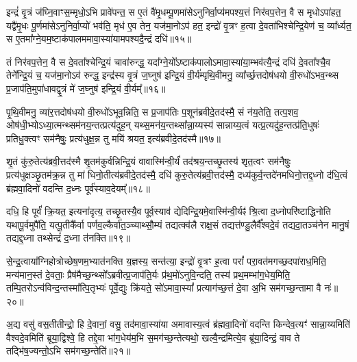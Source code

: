{\anuvakamend[{अ॒स्य॒ मा वेदा द्यावा॑पृथि॒व्योर॑ब्रवी॒दिति॒ तस्मा᳚च्च॒त्वारि॑ च॥२॥}]}

इन्द्रं॑ वृ॒त्रं ज॑घ्नि॒वाꣳस॒म्मृधो॒\-ऽभि प्रावे॑पन्त॒ स ए॒तं वै॑मृ॒धम्पू॒णमा॑से\-ऽनुनिर्वा॒प्य॑मपश्य॒त्तं निर॑वप॒त्तेन॒ वै स मृधो\-ऽपा॑हत॒ यद्वै॑मृ॒धः पू॒र्णमा॑से\-ऽनुनिर्वा॒प्यो॑ भव॑ति॒ मृध॑ ए॒व तेन॒ यज॑मा॒नो\-ऽप॑ हत॒ इन्द्रो॑ वृ॒त्रꣳ ह॒त्वा दे॒वता॑भिश्चेन्द्रि॒येण॑ च॒ व्या᳚र्ध्यत॒ स ए॒तमा᳚ग्ने॒यम॒ष्टाक॑पालममावा॒स्या॑यामपश्यदै॒न्द्रं दधि॑॥१५॥

तं निर॑वप॒त्तेन॒ वै स दे॒वता᳚श्चेन्द्रि॒यं चावा॑रुन्द्ध॒ यदा᳚ग्ने॒यो᳚\-ऽष्टाक॑पालो\-ऽमावा॒स्या॑या॒म्भव॑त्यै॒न्द्रं दधि॑ दे॒वता᳚श्चै॒व तेने᳚न्द्रि॒यं च॒ यज॑मा॒नो\-ऽव॑ रुन्द्ध॒ इन्द्र॑स्य वृ॒त्रं ज॒घ्नुष॑ इन्द्रि॒यं वी॒र्य॑म्पृथि॒वीमनु॒ व्या᳚र्च्छ॒त्तदोष॑धयो वी॒रुधो॑\-ऽभव॒न्थ्स प्र॒जाप॑ति॒मुपा॑धावद्वृ॒त्रं मे॑ ज॒घ्नुष॑ इन्द्रि॒यं वी॒र्यम्᳚॥१६॥

पृ॒थि॒वीमनु॒ व्या॑र॒त्तदोष॑धयो वी॒रुधो॑\-ऽभूव॒न्निति॒ स प्र॒जाप॑तिः प॒शून॑ब्रवीदे॒तद॑स्मै॒ सं न॑य॒तेति॒ तत्प॒शव॒ ओष॑धी॒भ्यो\-ऽध्या॒त्मन्थ्सम॑नय॒न्तत्प्रत्य॑दुह॒न् यथ्स॒मन॑य॒न्तथ्सा᳚न्ना॒य्यस्य॑ सान्नाय्य॒त्वं यत्प्र॒त्यदु॑ह॒न्तत्प्र॑ति॒धुषः॑ प्रतिधु॒क्त्वꣳ सम॑नैषुः॒ प्रत्य॑धुक्ष॒न्न तु मयि॑ श्रयत॒ इत्य॑ब्रवीदे॒तद॑स्मै॥१७॥

शृ॒तं कु॑रु॒तेत्य॑ब्रवी॒त्तद॑स्मै शृ॒तम॑कुर्वन्निन्द्रि॒यं वावास्मि॑न्वी॒र्यं॑ तद॑श्रय॒न्तच्छृ॒तस्य॑ शृत॒त्वꣳ सम॑नैषुः॒ प्रत्य॑धुक्षञ्छृ॒तम॑क्र॒न्न तु मा॑ धिनो॒तीत्य॑ब्रवीदे॒तद॑स्मै॒ दधि॑ कुरु॒तेत्य॑ब्रवी॒त्तद॑स्मै॒ दध्य॑कुर्व॒न्तदे॑नमधिनो॒त्तद्द॒ध्नो द॑धि॒त्वं ब्र॑ह्मवा॒दिनो॑ वदन्ति द॒ध्नः पूर्व॑स्याव॒देयम्᳚॥१८॥

दधि॒ हि पूर्वं॑ क्रि॒यत॒ इत्यना॑दृत्य॒ तच्छृ॒तस्यै॒व पूर्व॒स्याव॑ द्येदिन्द्रि॒यमे॒वास्मि॑न्वी॒र्यꣴ॑ श्रि॒त्वा द॒ध्नोपरि॑ष्टाद्धिनोति यथापू॒र्वमुपै॑ति॒ यत्पू॒तीकै᳚र्वा पर्णव॒ल्कैर्वा॑त॒ञ्च्याथ्सौ॒म्यं तद्यत्क्व॑लै राक्ष॒सं तद्यत्त॑ण्डु॒लैर्वै᳚श्वदे॒वं तद्यदा॒तञ्च॑नेन मानु॒षं तद्यद्द॒ध्ना तथ्सेन्द्रं॑ द॒ध्ना त॑नक्ति॥१९॥

से॒न्द्र॒त्वाया᳚ग्निहोत्रोच्छेष॒णम॒भ्यात॑नक्ति य॒ज्ञस्य॒ सन्त॑त्या॒ इन्द्रो॑ वृ॒त्रꣳ ह॒त्वा परां᳚ परा॒वत॑मगच्छ॒दपा॑राध॒मिति॒ मन्य॑मान॒स्तं दे॒वताः॒ प्रैष॑मैच्छ॒न्थ्सो᳚\-ऽब्रवीत्प्र॒जाप॑ति॒र्यः प्र॑थ॒मो॑\-ऽनुवि॒न्दति॒ तस्य॑ प्रथ॒मम्भा॑ग॒धेय॒मिति॒ तम्पि॒तरो\-ऽन्व॑विन्द॒न्तस्मा᳚त्पि॒तृभ्यः॑ पूर्वे॒द्युः क्रि॑यते॒ सो॑\-ऽमावा॒स्यां᳚ प्रत्याग॑च्छ॒त्तं दे॒वा अ॒भि सम॑गच्छ॒न्तामा वै नः॑॥२०॥

अ॒द्य वसु॑ वस॒तीतीन्द्रो॒ हि दे॒वानां॒ वसु॒ तद॑मावा॒स्या॑या अमावास्य॒त्वं ब्र॑ह्मवा॒दिनो॑ वदन्ति किन्देव॒त्यꣳ॑ सान्ना॒य्यमिति॑ वैश्वदे॒वमिति॑ ब्रूया॒द्विश्वे॒ हि तद्दे॒वा भा॑ग॒धेय॑म॒भि स॒मग॑च्छ॒न्तेत्यथो॒ खल्वै॒न्द्रमित्ये॒व ब्रू॑या॒दिन्द्रं॒ वाव ते तद्भि॑ष॒ज्यन्तो॒\-ऽभि सम॑गच्छ॒न्तेति॑॥२१॥

